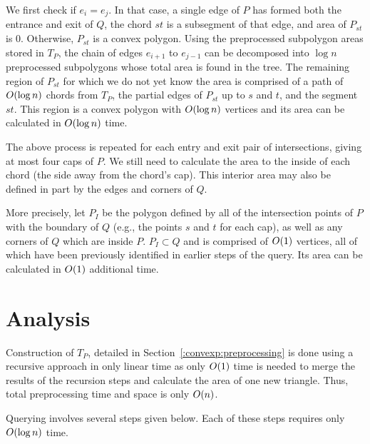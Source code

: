We first check if $e_i = e_j$. In that case, a single edge of $P$ has formed both the entrance and exit of $Q$, the chord $st$ is a subsegment of that edge, and area of $P_{st}$ is 0.  Otherwise, $P_{st}$ is a convex polygon. Using the preprocessed subpolygon areas stored in $T_P$, the chain of edges $e_{i+1}$ to $e_{j-1}$ can be decomposed into $\log{n}$ preprocessed subpolygons whose total area is found in the tree.  The remaining region of $P_{st}$ for which we do not yet know the area is comprised of a path of $O\!\left(\log{n}\right)$ chords from $T_P$, the partial edges of $P_{st}$ up to $s$ and $t$, and the segment $st$. This region is a convex polygon with $O\!\left(\log{n}\right)$ vertices and its area can be calculated in $O\!\left(\log{n}\right)$ time.

The above process is repeated for each entry and exit pair of intersections, giving at most four caps of $P$. We still need to calculate the area to the inside of each chord (the side away from the chord's cap). This interior area may also be defined in part by the edges and corners of $Q$. 

More precisely, let $P_I$ be the polygon defined by all of the intersection  points of $P$ with the boundary of $Q$ (e.g., the points $s$ and $t$ for each cap), as well as any corners of $Q$ which are inside $P$. $P_I \subset Q$ and is comprised of $O\!\left(1\right)$ vertices, all of which have been previously identified in earlier steps of the query. Its area can be calculated in $O\!\left(1\right)$ additional time.


\section{Analysis}
\label{:convexp:analysis}

Construction of $T_P$, detailed in Section~\ref{:convexp:preprocessing} is done using a recursive approach in only linear time as only $O\!\left(1\right)$ time is needed to merge the results of the recursion steps and calculate the area of one new triangle. Thus, total preprocessing time and space is only $O\!\left(n\right)$.

Querying involves several steps given below. Each of these steps requires only $O\!\left(\log{n}\right)$ time.

